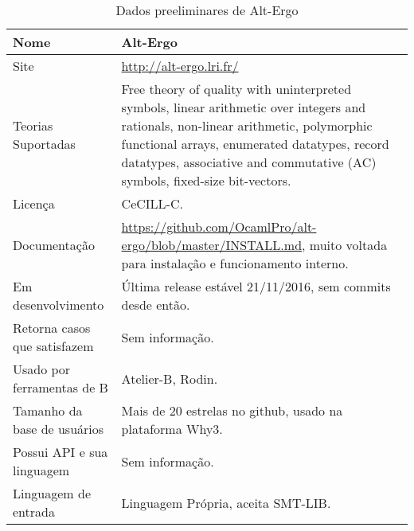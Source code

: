 \begin{table}[!h]
  \centering
  \begin{tabular}{ | l | p{10cm} |}
    \hline
	Nome & Alt-Ergo \\ \hline
    Site & \url{http://alt-ergo.lri.fr/} \\ \hline 
    Teorias Suportadas & Free theory of quality with uninterpreted symbols, linear arithmetic over integers and rationals, non-linear arithmetic, polymorphic functional arrays, enumerated datatypes, record datatypes, associative and commutative (AC) symbols, fixed-size bit-vectors.\\ \hline
    Licença & CeCILL-C. \\ \hline
    Documentação & \url{https://github.com/OcamlPro/alt-ergo/blob/master/INSTALL.md}, muito voltada para instalação e funcionamento interno. \\ \hline
    Em desenvolvimento & Última release estável 21/11/2016, sem commits desde então. \\ \hline
    Retorna casos que satisfazem & Sem informação. \\ \hline
    Usado por ferramentas de B & Atelier-B, Rodin. \\ \hline
    Tamanho da base de usuários & Mais de 20 estrelas no github, usado na plataforma Why3. \\ \hline
    Possui API e sua linguagem & Sem informação. \\ \hline
    Linguagem de entrada & Linguagem Própria, aceita SMT-LIB. \\ \hline
  \end{tabular}
  \caption{Dados preeliminares de Alt-Ergo }
  \label{tab:LABEL_TAB_2}
\end{table}

\FloatBarrier

